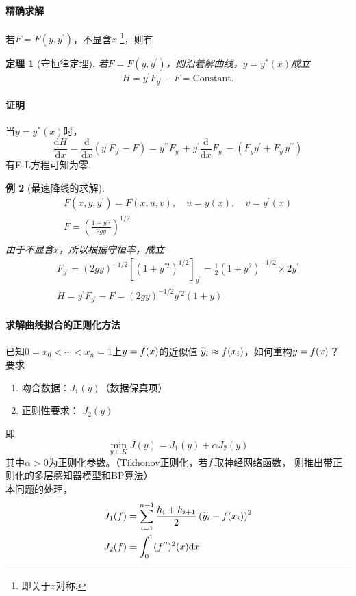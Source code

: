 \documentclass[12pt, a4paper]{article}
\theoremstyle{margin}
\newtheorem{thm}{定理}
\newtheorem{exa}[thm]{例}
\newcommand{\pr}{\prime}
\newcommand{\hp}{^\prime}
\newcommand{\f}{\mathnormal{f}}
\newcommand{\rd}{\mathrm{d}}
\newcommand{\proof}{\paragraph{证明}}
\begin{document}
  \paragraph{精确求解}
    若$F = F(y,y\hp)$，不显含$x$
    \footnote{即关于$x$对称. }，则有
  \begin{thm}[守恒律定理]
    若$F = F(y,y\hp)$，则沿着解曲线，$y=y^*(x)$成立
    \[
      H = y\hp F_{y\hp}-F = \text{Constant}.
    \]
  \end{thm}
  \proof
    当$y=y^*(x)$时，
    \[
      \frac{\rd H}{\rd x} = \frac{\rd}{\rd x}(y\hp F_{y\hp}-F) =
      y^{\pr\pr}F_{y\hp} + y\hp\frac{\rd}{\rd x}F_{y\hp} -
      \left( F_{y}y\hp + F_{y\hp}y^{\pr\pr} \right)
    \]
    有E-L方程可知为零.

  \begin{exa}[最速降线的求解]
    \[\begin{split}
    F(x, y, y\hp) = F(x, u, v), \quad u = y(x),\quad v = y\hp(x) \\
       F = \left( \frac{1+y^{\pr2}}{2gy} \right)^{1/2} \\
    \end{split}\]
    由于不显含$x$，所以根据守恒率，成立
    \[\begin{split}
      F_{y\hp} = (2gy)^{-1/2}[(1+y^{\pr2})^{1/2}]_{y\hp} = \frac{1}{2}(1+y^2)^{-1/2} \times 2y\hp\\
      H = y\hp F_{y\hp} - F = (2gy)^{-1/2}y^{\pr2}(1+y)
    \end{split}\]
  \end{exa}

  \paragraph{求解曲线拟合的正则化方法}
    已知$0=x_0 < \cdots < x_n = 1$上$y=\f(x)$的近似值
    $\widetilde{y}_i \approx \f(x_i)$，如何重构$y=\f(x)$？
    要求
    \begin{enumerate}
      \item 吻合数据：$J_1(y)$（数据保真项）
      \item 正则性要求： $J_2(y)$
    \end{enumerate}
    即
    \begin{equation}
      \label{equ: 曲线拟合}
      \min_{y\in K} J(y) = J_1(y) + \alpha J_2(y)
    \end{equation}
    其中$\alpha >0$为正则化参数。（Tikhonov正则化，若$\f$取神经网络函数，
    则推出带正则化的多层感知器模型和BP算法）\\
    本问题的处理，
    \[\begin{split}
      &J_1(\f) = \sum_{i=1}^{n-1}\frac{h_i + h_{i+1}}{2}
      \left( \widetilde{y}_i - \f(x_i) \right)^2 \\
      &J_2(\f)  = \int_0^1 (\f^{\pr\pr})^2(x) \rd x
    \end{split}\]
\end{document}
